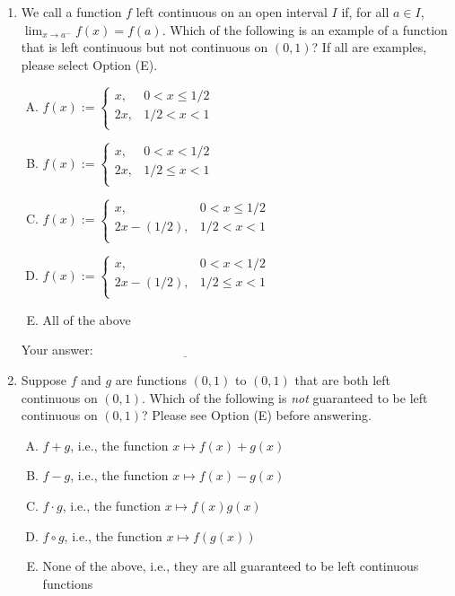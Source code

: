 \documentclass[10pt]{amsart}
\begin{document}
\begin{enumerate}

\item We call a function $f$ left continuous on an open interval $I$
  if, for all $a \in I$, $\displaystyle \lim_{x \to a^-} f(x) =
  f(a)$. Which of the following is an example of a function that is
  left continuous but not continuous on $(0,1)$? If all are examples,
  please select Option (E).

  \begin{enumerate}[(A)]
  \item $f(x) := \left \lbrace\begin{array}{rl}x, & 0 < x \le 1/2 \\ 2x, & 1/2 < x < 1 \\\end{array}\right.$
  \item $f(x) := \left \lbrace\begin{array}{rl}x, & 0 < x < 1/2 \\ 2x, & 1/2 \le x < 1 \\\end{array}\right.$
  \item $f(x) := \left \lbrace\begin{array}{rl}x, & 0 < x \le 1/2 \\ 2x - (1/2), & 1/2 < x < 1 \\\end{array}\right.$
  \item $f(x) := \left \lbrace\begin{array}{rl}x, & 0 < x < 1/2 \\ 2x - (1/2), & 1/2 \le x < 1 \\\end{array}\right.$
  \item All of the above
  \end{enumerate}

  \vspace{0.1in}
  Your answer: $\underline{\qquad\qquad\qquad\qquad\qquad\qquad\qquad}$
  \vspace{0.1in}
  
\item Suppose $f$ and $g$ are functions $(0,1)$ to $(0,1)$ that are
  both left continuous on $(0,1)$. Which of the following is {\em not}
  guaranteed to be left continuous on $(0,1)$? Please see Option (E)
  before answering.

  \begin{enumerate}[(A)]
  \item $f + g$, i.e., the function $x \mapsto f(x) + g(x)$
  \item $f - g$, i.e., the function $x \mapsto f(x) - g(x)$
  \item $f \cdot g$, i.e., the function $x \mapsto f(x)g(x)$
  \item $f \circ g$, i.e., the function $x \mapsto f(g(x))$
  \item None of the above, i.e., they are all guaranteed to be left
  continuous functions
  \end{enumerate}


\end{enumerate}
\end{document}
